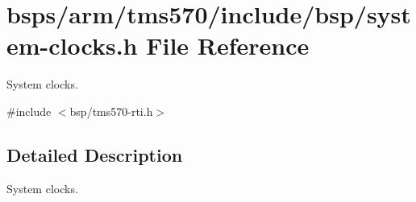 \hypertarget{tms570_2include_2bsp_2system-clocks_8h}{}\section{bsps/arm/tms570/include/bsp/system-\/clocks.h File Reference}
\label{tms570_2include_2bsp_2system-clocks_8h}


System clocks.  


{\ttfamily \#include $<$bsp/tms570-\/rti.\+h$>$}\newline


\subsection{Detailed Description}
System clocks. 

